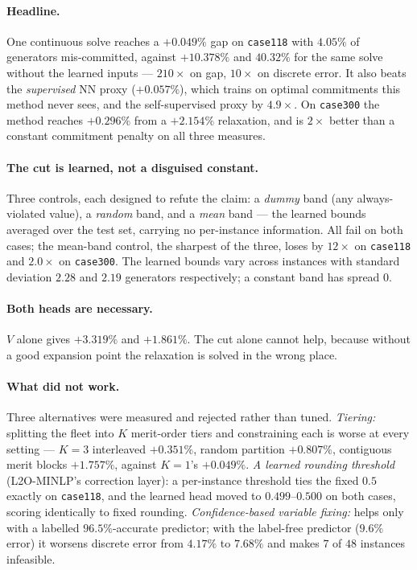 \documentclass[11pt]{article}
\begin{document}
\paragraph{Headline.} One continuous solve reaches a $+0.049\%$ gap on
\texttt{case118} with $4.05\%$ of generators mis-committed, against $+10.378\%$
and $40.32\%$ for the same solve without the learned inputs --- $210\times$ on
gap, $10\times$ on discrete error. It also beats the \emph{supervised} NN proxy
($+0.057\%$), which trains on optimal commitments this method never sees, and
the self-supervised proxy by $4.9\times$. On \texttt{case300} the method reaches
$+0.296\%$ from a $+2.154\%$ relaxation, and is $2\times$ better than a constant
commitment penalty on all three measures.

\paragraph{The cut is learned, not a disguised constant.} Three controls, each
designed to refute the claim: a \emph{dummy} band (any always-violated value), a
\emph{random} band, and a \emph{mean} band --- the learned bounds averaged over
the test set, carrying no per-instance information. All fail on both cases; the
mean-band control, the sharpest of the three, loses by $12\times$ on
\texttt{case118} and $2.0\times$ on \texttt{case300}. The learned bounds vary
across instances with standard deviation $2.28$ and $2.19$ generators
respectively; a constant band has spread $0$.

\paragraph{Both heads are necessary.} $V$ alone gives $+3.319\%$ and $+1.861\%$.
The cut alone cannot help, because without a good expansion point the relaxation
is solved in the wrong place.

\paragraph{What did not work.} Three alternatives were measured and rejected
rather than tuned. \emph{Tiering:} splitting the fleet into $K$ merit-order tiers
and constraining each is worse at every setting --- $K{=}3$ interleaved
$+0.351\%$, random partition $+0.807\%$, contiguous merit blocks $+1.757\%$,
against $K{=}1$'s $+0.049\%$. \emph{A learned rounding threshold}
(L2O-MINLP's correction layer): a per-instance threshold ties the fixed $0.5$
exactly on \texttt{case118}, and the learned head moved to $0.499$--$0.500$ on
both cases, scoring identically to fixed rounding. \emph{Confidence-based
variable fixing:} helps only with a labelled $96.5\%$-accurate predictor; with
the label-free predictor ($9.6\%$ error) it worsens discrete error from $4.17\%$
to $7.68\%$ and makes $7$ of $48$ instances infeasible.
\end{document}
